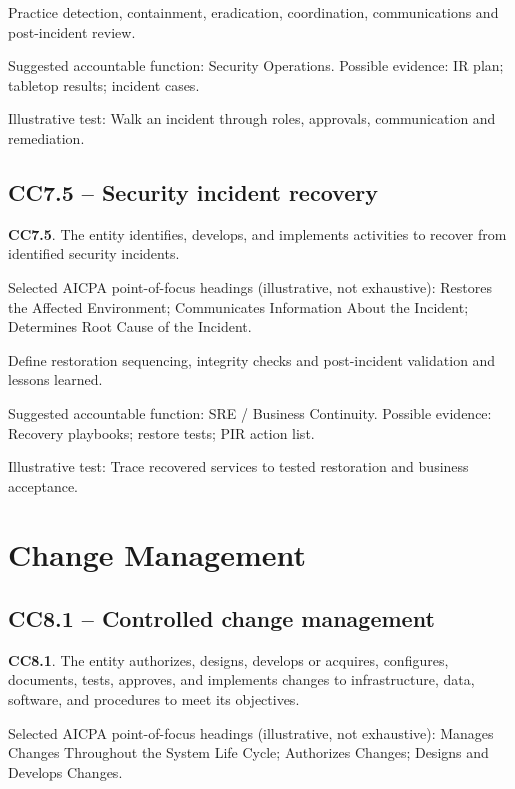 \documentclass[10pt,oneside]{report}
\begin{document}
\begin{engineeringbox}
Practice detection, containment, eradication, coordination, communications and post-incident review.
\end{engineeringbox}
Suggested accountable function: Security Operations. Possible evidence: IR plan; tabletop results; incident cases.

Illustrative test: Walk an incident through roles, approvals, communication and remediation.

\subsection*{CC7.5 -- Security incident recovery}
\begin{aicpabox}
\textbf{CC7.5}. The entity identifies, develops, and implements activities to recover from identified security incidents.\par{}
\end{aicpabox}
Selected AICPA point-of-focus headings (illustrative, not exhaustive): Restores the Affected Environment; Communicates Information About the Incident; Determines Root Cause of the Incident.

\begin{engineeringbox}
Define restoration sequencing, integrity checks and post-incident validation and lessons learned.
\end{engineeringbox}
Suggested accountable function: SRE / Business Continuity. Possible evidence: Recovery playbooks; restore tests; PIR action list.

Illustrative test: Trace recovered services to tested restoration and business acceptance.

\section{Change Management}
\subsection*{CC8.1 -- Controlled change management}
\begin{aicpabox}
\textbf{CC8.1}. The entity authorizes, designs, develops or acquires, configures, documents, tests, approves, and implements changes to infrastructure, data, software, and procedures to meet its objectives.\par{}
\end{aicpabox}
Selected AICPA point-of-focus headings (illustrative, not exhaustive): Manages Changes Throughout the System Life Cycle; Authorizes Changes; Designs and Develops Changes.
\end{document}
